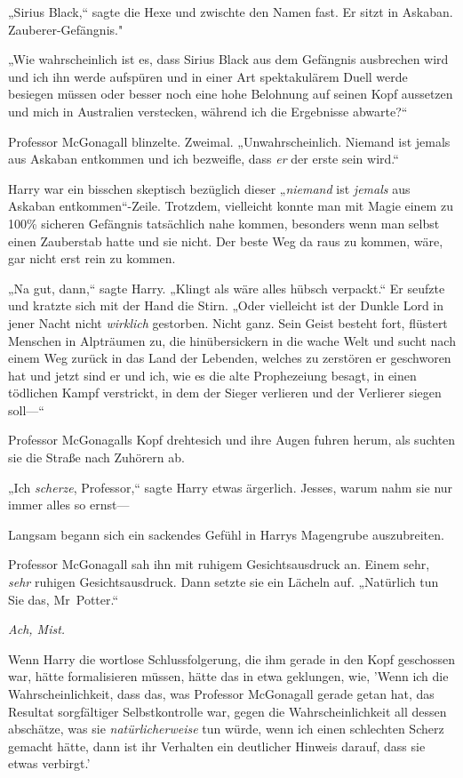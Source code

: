 {„Sirius Black,“ sagte die Hexe und zwischte den Namen fast. Er sitzt in Askaban. Zauberer-Gefängnis."

„Wie wahrscheinlich ist es, dass Sirius Black aus dem Gefängnis ausbrechen wird und ich ihn werde aufspüren und in einer Art spektakulärem Duell werde besiegen müssen oder besser noch eine hohe Belohnung auf seinen Kopf aussetzen und mich in Australien verstecken, während ich die Ergebnisse abwarte?“

Professor McGonagall blinzelte. Zweimal. „Unwahrscheinlich. Niemand ist jemals aus Askaban entkommen und ich bezweifle, dass \emph{er} der erste sein wird.“

Harry war ein bisschen skeptisch bezüglich dieser „\emph{niemand} ist \emph{jemals} aus Askaban entkommen“-Zeile. Trotzdem, vielleicht konnte man mit Magie einem zu 100\% sicheren Gefängnis tatsächlich nahe kommen, besonders wenn man selbst einen Zauberstab hatte und sie nicht. Der beste Weg da raus zu kommen, wäre, gar nicht erst rein zu kommen.

„Na gut, dann,“ sagte Harry. „Klingt als wäre alles hübsch verpackt.“ Er seufzte und kratzte sich mit der Hand die Stirn. „Oder vielleicht ist der Dunkle Lord in jener Nacht nicht \emph{wirklich} gestorben. Nicht ganz. Sein Geist besteht fort, flüstert Menschen in Alpträumen zu, die hinübersickern in die wache Welt und sucht nach einem Weg zurück in das Land der Lebenden, welches zu zerstören er geschworen hat und jetzt sind er und ich, wie es die alte Prophezeiung besagt, in einen tödlichen Kampf verstrickt, in dem der Sieger verlieren und der Verlierer siegen soll—“

Professor McGonagalls Kopf drehtesich und ihre Augen fuhren herum, als suchten sie die Straße nach Zuhörern ab.

„Ich \emph{scherze}, Professor,“ sagte Harry etwas ärgerlich. Jesses, warum nahm sie nur immer alles so ernst—

Langsam begann sich ein sackendes Gefühl in Harrys Magengrube auszubreiten.

Professor McGonagall sah ihn mit ruhigem Gesichtsausdruck an. Einem sehr, \emph{sehr} ruhigen Gesichtsausdruck. Dann setzte sie ein Lächeln auf. „Natürlich tun Sie das, Mr~Potter.“

\emph{Ach, Mist.}

Wenn Harry die wortlose Schlussfolgerung, die ihm gerade in den Kopf geschossen war, hätte formalisieren müssen, hätte das in etwa geklungen, wie, 'Wenn ich die Wahrscheinlichkeit, dass das, was Professor McGonagall gerade getan hat, das Resultat sorgfältiger Selbstkontrolle war, gegen die Wahrscheinlichkeit all dessen abschätze, was sie \emph{natürlicherweise} tun würde, wenn ich einen schlechten Scherz gemacht hätte, dann ist ihr Verhalten ein deutlicher Hinweis darauf, dass sie etwas verbirgt.'

}
